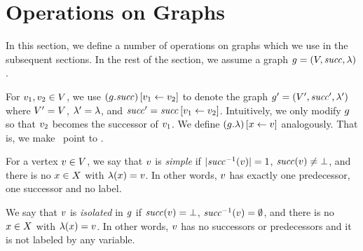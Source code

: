 %
\section{Operations on Graphs}
\label{section:graphops}
In this section, we define a number of operations on graphs which we
use in the subsequent sections.
%
In the rest of the section, we assume a graph
$g=\left(V,{\it succ},\lambda\right)$.
%

For $v_1,v_2\in V$, we use
$\left(g.{\it succ}\right)\left[v_1\leftarrow v_2\right]$ to denote the
graph $g'=\left(V',{\it succ}',\lambda'\right)$ where
$V'=V$, $\lambda'=\lambda$, and
${\it succ}'={\it succ}\left[v_1\leftarrow v_2\right]$.
%
Intuitively, we only modify $g$ so that $v_2$ becomes the
successor of $v_1$.
%
We define $\left(g.\lambda\right)\left[x\leftarrow v\right]$
analogously. That is, we make \xvar\ point to \vertex.
%

%
For a vertex $v\in V$, we say that $v$ is {\it simple} if
$|{\it succ}^{-1}(v)|=1$, ${\it succ}(v)\neq\bot$, and
there is no $x\in X$ with $\lambda(x)=v$.
%
In other words, $v$ has exactly one predecessor, one successor 
and no label.
%
%
\ignore{%
} %
%
%
We say that $v$ is %
{\it isolated} in $g$ if ${\it succ}(v)=\bot$,
${\it succ}^{-1}(v)=\emptyset$, and there is no $x\in X$ with
$\lambda(x)=v$.
%
In other words, $v$ has no successors or predecessors and it is
not labeled by any variable.
%

